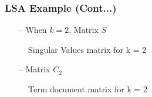 \documentclass{beamer}
\begin{document}
\begin{frame}[noframenumbering]
\frametitle{LSA Example (Cont...)}

\begin{itemize}
\item[--] When $k = 2$, Matrix $S$
\end{itemize}
\begin{figure}[h] 
\centering
{}
\centering
\caption{Singular Values matrix for k = 2}
\label{Sigma_2_LSA}
\end{figure}

\begin{itemize}
\item[--] Matrix $C_2$
\end{itemize}
\begin{figure}[h] 
\centering
{}
\centering
\caption{Term document matrix for k = 2}
\label{C_2_LSA}
\end{figure}

\end{frame}
\end{document}
